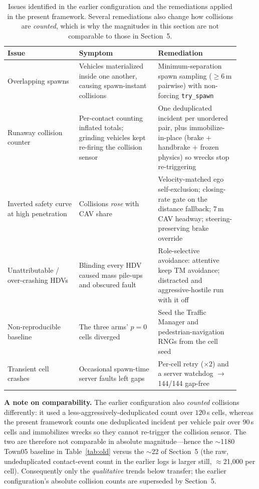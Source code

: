 \documentclass[11pt]{article}
\begin{document}
\begin{table}[t]
  \centering
  \caption{Issues identified in the earlier configuration and the remediations
  applied in the present framework. Several remediations also change how collisions
  are \emph{counted}, which is why the magnitudes in this section are not comparable
  to those in Section~5.}
  \label{tab:remediation}
  \small
  \begin{tabular}{p{0.29\linewidth} p{0.31\linewidth} p{0.32\linewidth}}
    \toprule
    Issue & Symptom & Remediation \\
    \midrule
    Overlapping spawns & Vehicles materialized inside one another, causing
      spawn-instant collisions & Minimum-separation spawn sampling ($\geq 6$\,m
      pairwise) with non-forcing \texttt{try\_spawn} \\
    Runaway collision counter & Per-contact counting inflated totals; grinding
      vehicles kept re-firing the collision sensor & One deduplicated incident per
      unordered pair, plus immobilize-in-place (brake $+$ handbrake $+$ frozen
      physics) so wrecks stop re-triggering \\
    Inverted safety curve at high penetration & Collisions \emph{rose} with CAV
      share & Velocity-matched ego self-exclusion; closing-rate gate on the distance
      fallback; $7$\,m CAV headway; steering-preserving brake override \\
    Unattributable / over-crashing HDVs & Blinding every HDV caused mass pile-ups and
      obscured fault & Role-selective avoidance: attentive keep TM avoidance;
      distracted and aggressive-hostile run with it off \\
    Non-reproducible baseline & The three arms' $p{=}0$ cells diverged & Seed the
      Traffic Manager and pedestrian-navigation RNGs from the cell seed \\
    Transient cell crashes & Occasional spawn-time server faults left gaps & Per-cell
      retry ($\times2$) and a server watchdog $\rightarrow$ 144/144 gap-free \\
    \bottomrule
  \end{tabular}
\end{table}

\noindent\textbf{A note on comparability.} The earlier configuration also
\emph{counted} collisions differently: it used a less-aggressively-deduplicated
count over $120$\,s cells, whereas the present framework counts one deduplicated
incident per vehicle pair over $90$\,s cells and immobilizes wrecks so they cannot
re-trigger the collision sensor. The two are therefore not comparable in absolute
magnitude---hence the $\sim$1180 Town05 baseline in Table~\ref{tab:old} versus the
$\sim$22 of Section~5 (the raw, undeduplicated contact-event count in the earlier
logs is larger still, $\approx$21{,}000 per cell). Consequently only the
\emph{qualitative} trends below transfer; the earlier configuration's absolute
collision counts are superseded by Section~5.
\end{document}
